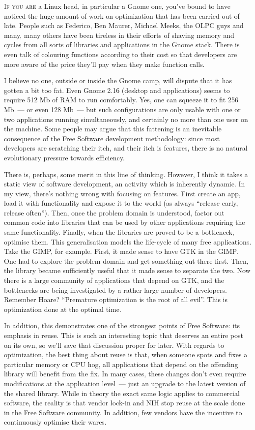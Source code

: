 \documentclass{book}
\begin{document}
\lettrine{I}{f you are} a Linux head, in particular a Gnome one,
you've bound to have noticed the huge amount of work on optimization
that has been carried out of late. People such as Federico, Ben
Maurer, Michael Meeks, the OLPC guys and many, many others have been
tireless in their efforts of shaving memory and cycles from all sorts
of libraries and applications in the Gnome stack. There is even talk
of colouring functions according to their cost so that developers are
more aware of the price they'll pay when they make function calls.

I believe no one, outside or inside the Gnome camp, will dispute that
it has gotten a bit too fat. Even Gnome 2.16 (desktop and
applications) seems to require 512 Mb of RAM to run comfortably. Yes,
one can squeeze it to fit 256 Mb~--- or even 128 Mb~--- but such
configurations are only usable with one or two applications running
simultaneously, and certainly no more than one user on the
machine. Some people may argue that this fattening is an inevitable
consequence of the Free Software development methodology: since most
developers are scratching their itch, and their itch is features,
there is no natural evolutionary pressure towards efficiency.

There is, perhaps, some merit in this line of thinking. However, I
think it takes a static view of software development, an activity
which is inherently dynamic. In my view, there's nothing wrong with
focusing on features. First create an app, load it with functionality
and expose it to the world (as always ``release early, release
often''). Then, once the problem domain is understood, factor out
common code into libraries that can be used by other applications
requiring the same functionality. Finally, when the libraries are
proved to be a bottleneck, optimise them. This generalisation models
the life-cycle of many free applications. Take the GIMP, for
example. First, it made sense to have GTK in the GIMP. One had to
explore the problem domain and get something out there first. Then,
the library became sufficiently useful that it made sense to separate
the two. Now there is a large community of applications that depend on
GTK, and the bottlenecks are being investigated by a rather large
number of developers. Remember Hoare? ``Premature optimization is the
root of all evil''. This is optimization done at the optimal time.

In addition, this demonstrates one of the strongest points of Free
Software: its emphasis in reuse. This is such an interesting topic
that deserves an entire post on its own, so we'll save that discussion
proper for later. With regards to optimization, the best thing about
reuse is that, when someone spots and fixes a particular memory or CPU
hog, all applications that depend on the offending library will
benefit from the fix. In many cases, these changes don't even require
modifications at the application level~--- just an upgrade to the
latest version of the shared library. While in theory the exact same
logic applies to commercial software, the reality is that vendor
lock-in and NIH stop reuse at the scale done in the Free Software
community. In addition, few vendors have the incentive to continuously
optimise their wares.
\end{document}
